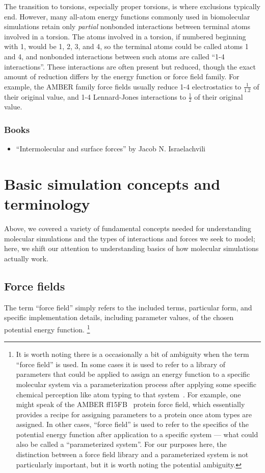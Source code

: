 \documentclass[9pt,bestpractices]{livecoms}
\begin{document}
The transition to torsions, especially proper torsions, is where exclusions
typically end.
However, many all-atom energy functions commonly used in biomolecular simulations retain only \emph{partial} nonbonded interactions between terminal atoms involved in a torsion. 
The atoms involved in a torsion, if numbered beginning with 1, would be 1, 2, 3, and 4, so the terminal atoms could be called atoms 1 and 4, and nonbonded interactions between such atoms are called ``1-4 interactions''. 
These interactions are often present but reduced, though the exact amount of reduction differs by the energy function or force field family.
For example, the AMBER family force fields usually reduce 1-4 electrostatics to $\frac{1}{1.2}$ of their original value, and 1-4 Lennard-Jones interactions to $\frac{1}{2}$ of their original value.


\subsubsection{Books}
\begin{itemize}
\item ``Intermolecular and surface forces'' by Jacob N. Israelachvili
\end{itemize}


\section{Basic simulation concepts and terminology}
\label{sec:basics}

Above, we covered a variety of fundamental concepts needed for understanding molecular simulations and the types of interactions and forces we seek to model; here, we shift our attention to understanding basics of how molecular simulations actually work.

\subsection{Force fields}
\label{sec:force_fields}

The term ``force field'' simply refers to the included terms, particular form, and specific implementation details, including parameter values, of the 
chosen potential energy function.
\footnote{It is worth noting there is a occasionally a bit of ambiguity when the term ``force field'' is used.
In some cases it is used to refer to a library of parameters that could be applied to assign an energy function to a specific molecular system via a parameterization process after applying some specific chemical perception like atom typing to that system~\citep{Mobley:2018:bioRxiv}.
For example, one might speak of the AMBER ff15FB~\citep{amber15FB} protein force field, which essentially provides a recipe for assigning parameters to a protein once atom types are assigned.
In other cases, ``force field'' is used to refer to the specifics of the potential energy function after application to a specific system --- what could also be called a ``parameterized system''. 
For our purposes here, the distinction between a force field library and a parameterized system is not particularly important, but it is worth noting the potential ambiguity. }
\end{document}
